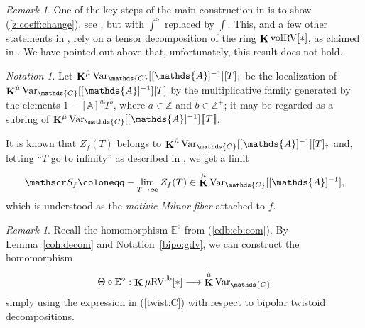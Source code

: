 \documentclass[12pt]{amsart}
\newcommand{\memph}[1]{{\color{magenta}\emph{#1}}}
\theoremstyle{plain}
\theoremstyle{definition}
\theoremstyle{remark}
\newtheorem{rem}[thm]{Remark}
\newtheorem{nota}[thm]{Notation}
\numberwithin{equation}{section}
\theoremstyle{plain}
\newcommand{\RV}{\textup{RV}}
\newcommand{\Z}{\mathds{Z}}
\newcommand{\A}{\mathds{A}}
\newcommand{\C}{\mathds{C}}
\newcommand{\0}{\emptyset}
\newcommand{\dbra}[1]{%
  \,[\mkern-6.8mu[\, #1 \,]\mkern-6.8mu]}
\newcommand{\bb}[1]{\mathbb{#1}}
\newcommand{\limplies}{\rightarrow}
\newcommand{\fun}{\longrightarrow}
\newcommand{\mgRV}{{\mu}{\RV}}
\DeclareMathOperator{\ggk}{\mathbf{K}}
\DeclareMathOperator{\db}{d \! b}
\newcommand{\var}{\textup{Var}}
\newcommand{\gmv}{\ggk^{\hat \mu}\var_{\C}}
\begin{document}
\begin{rem}
One of the key steps of the main construction in \cite[\S~8]{hru:loe:lef} is to show (\ref{z:coeff:change}), see \cite[Proposition~8.3.1]{hru:loe:lef}, but with $\int^\diamond$  replaced by $\int$. This, and a few other statements in \cite[\S~8]{hru:loe:lef}, rely on a tensor decomposition of the ring $\ggk \mathrm{vol}\RV[*]$, as claimed in \cite[Proposition~10.10(2)]{hrushovski:kazhdan:integration:vf}. We have pointed out above that, unfortunately, this result does not hold.
\end{rem}

\begin{nota}\label{dag:loc}
Let $\gmv[[\A]^{-1}][T]_{\dag}$ be the localization of $\gmv[[\A]^{-1}][T]$ by the multiplicative family generated by the elements $1 - [\A]^{a}T^b$, where $a \in \Z$ and $b \in \Z^+$; it may be regarded as a subring of  $\gmv[[\A]^{-1}] \dbra T$.
\end{nota}

It is known that $Z_f(T)$ belongs to $\gmv[[\A]^{-1}][T]_{\dag}$ and, letting ``$T$ go to infinity'' as described in \cite[\S~8.4]{hru:loe:lef}, we get a limit
\[
\mathscr S_f \coloneqq - \lim_{T \limplies \infty} Z_f(T) \in \gmv[[\A]^{-1}],
\]
which is understood as the \memph{motivic Milnor fiber} attached to $f$.

\begin{rem}
Recall the homomorphism $\bb E^{\diamond}$ from (\ref{edb:eb:com}).
By Lemma~\ref{coh:decom} and Notation~\ref{bipo:gdv}, we can construct the homomorphism
\[
\Theta \circ \bb E^{\diamond} : \ggk \mgRV^{\db}[*] \fun \gmv
\]
simply using the expression in (\ref{twist:C}) with respect to  bipolar twistoid decompositions.
\end{rem}
\end{document}
